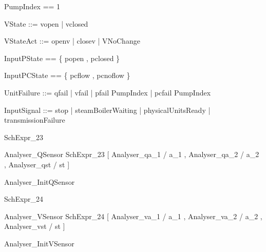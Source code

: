 \documentclass{article}
\begin{document}
\begin{zed}
	PumpIndex == 1 
\end{zed}

\begin{zed}
	VState ::= vopen | vclosed
\end{zed}

\begin{zed}
	VStateAct ::= openv | closev | VNoChange
\end{zed}

\begin{zed}
	InputPState == \{ popen , pclosed \}
\end{zed}

\begin{zed}
	InputPCState == \{ pcflow , pcnoflow \}
\end{zed}

\begin{zed}
	UnitFailure ::= qfail | vfail | pfail \ldata PumpIndex \rdata | pcfail \ldata PumpIndex \rdata
\end{zed}

\begin{zed}
	InputSignal ::= stop | steamBoilerWaiting | physicalUnitsReady | transmissionFailure
\end{zed}

\begin{zed}
	SchExpr\_23 
\end{zed}

\begin{zed}
	Analyser\_QSensor  SchExpr\_23 [ Analyser\_qa\_1 / a\_1 , Analyser\_qa\_2 / a\_2 , Analyser\_qst / st ]
\end{zed}

\begin{zed}
	Analyser\_InitQSensor 
\end{zed}

\begin{zed}
	SchExpr\_24 
\end{zed}

\begin{zed}
	Analyser\_VSensor  SchExpr\_24 [ Analyser\_va\_1 / a\_1 , Analyser\_va\_2 / a\_2 , Analyser\_vst / st ]
\end{zed}

\begin{zed}
	Analyser\_InitVSensor 
\end{zed}
\end{document}
